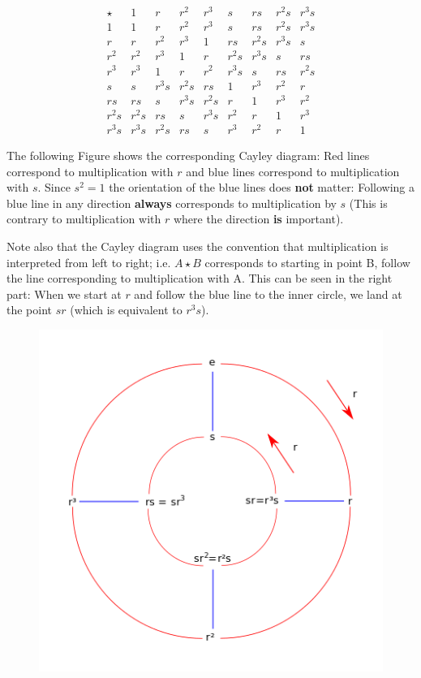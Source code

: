 \[
\begin{array}{c|cccccccc}
\star   & 1    & r & r^2  & r^3 & s & rs & r^2s & r^3s \\
\hline
1 & 1 & r & r^2 & r^3 & s & rs & r^2s & r^3s \\
r & r & r^2 & r^3 & 1 & rs & r^2s & r^3s  & s \\
r^2 & r^2 & r^3 & 1 & r & r^2 s & r^3s & s & rs \\
r^3 & r^3 & 1 & r & r^2 & r^3s & s & rs & r^2s \\
s  &  s & r^3s & r^2s & rs & 1 & r^3  & r^2& r\\
rs & rs & s & r^3s& r^2s & r & 1  & r^3 & r^2\\
r^2s & r^2s & rs & s & r^3s & r^2 & r & 1 & r^3\\
r^3s & r^3s & r^2s & rs & s & r^3 & r^2 & r&  1
\end{array}
\]

The following Figure shows the corresponding Cayley diagram: Red lines correspond to multiplication with $r$ and blue lines correspond to multiplication with $s$. Since $s^2 = 1$ the orientation of the blue lines does \textbf{not} matter: Following a blue line in any direction \textbf{always} corresponds to multiplication by $s$ (This is contrary to multiplication with $r$ where the direction \textbf{is} important).

Note also that the Cayley diagram uses the convention that multiplication is interpreted from left to right; i.e. $A \star B$ corresponds to starting in point B, follow the line corresponding to multiplication with A. This can be seen in the right part: When we start at $r$ and follow the blue line to the inner circle, we land at the point $sr$ (which is equivalent to $r^3s$).

\begin{figure}[H]
\centering
\includegraphics[scale=0.55]{images/groups_04_4.png}
\end{figure}

